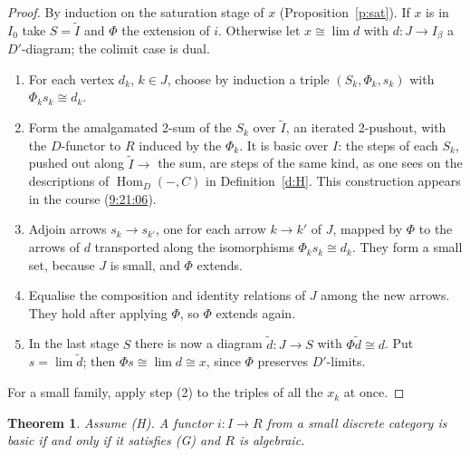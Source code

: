 \documentclass[11pt,a4paper]{amsart}
\newtheorem{theorem}{Theorem}[section]
\theoremstyle{definition}
\theoremstyle{remark}
\newcommand{\ts}[3]{\href{https://www.youtube.com/watch?v=#1&t=#2}{#3}}
\newcommand{\Hom}{\operatorname{Hom}}
\begin{document}
\begin{proof}
By induction on the saturation stage of $x$ (Proposition~\ref{p:sat}). If $x$ is in $I_0$ take $S=\widetilde I$ and $\Phi$ the extension of $i$. Otherwise let $x\cong\lim d$ with $d\colon J\to I_\beta$ a $D'$-diagram; the colimit case is dual.
\begin{enumerate}
\item For each vertex $d_k$, $k\in J$, choose by induction a triple $(S_k,\Phi_k,s_k)$ with $\Phi_ks_k\cong d_k$.
\item Form the amalgamated 2-sum of the $S_k$ over $\widetilde I$, an iterated 2-pushout, with the $D$-functor to $R$ induced by the $\Phi_k$. It is basic over $I$: the steps of each $S_k$, pushed out along $\widetilde I\to$ the sum, are steps of the same kind, as one sees on the descriptions of $\Hom_D(-,C)$ in Definition~\ref{d:H}. This construction appears in the course (\ts{PqCQM3Pcl6Q}{9h21m6s}{9:21:06}).
\item Adjoin arrows $s_k\to s_{k'}$, one for each arrow $k\to k'$ of $J$, mapped by $\Phi$ to the arrows of $d$ transported along the isomorphisms $\Phi_ks_k\cong d_k$. They form a small set, because $J$ is small, and $\Phi$ extends.
\item Equalise the composition and identity relations of $J$ among the new arrows. They hold after applying $\Phi$, so $\Phi$ extends again.
\item In the last stage $S$ there is now a diagram $\tilde d\colon J\to S$ with $\Phi\tilde d\cong d$. Put $s=\lim\tilde d$; then $\Phi s\cong\lim d\cong x$, since $\Phi$ preserves $D'$-limits.
\end{enumerate}
For a small family, apply step (2) to the triples of all the $x_k$ at once.
\end{proof}

\begin{theorem}\label{t:reduction}
Assume (H). A functor $i\colon I\to R$ from a small discrete category is basic if and only if it satisfies (G) and $R$ is algebraic.
\end{theorem}
\end{document}
